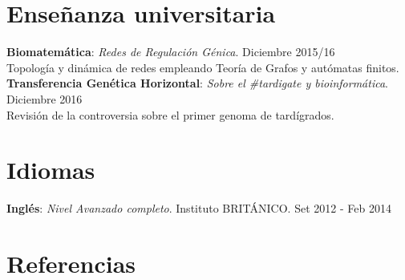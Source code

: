 \documentclass[margin,line]{res}
\begin{document}
\begin{resume}
		
		
		
		\section{\sc Enseñanza universitaria}
		{\bf Biomatemática}: {\em Redes de Regulación Génica}. \hfill {Diciembre 2015/16}\\ Topología y dinámica de redes empleando Teoría de Grafos y autómatas finitos. \\[4pt] 
		{\bf Transferencia Genética Horizontal}: {\em Sobre el \#tardigate y bioinformática}. \hfill {Diciembre 2016}\\ Revisión de la controversia sobre el primer genoma de tardígrados.\\
		
		
		\section{\sc Idiomas}
		{\bf Inglés}: {\em Nivel Avanzado completo}. Instituto BRITÁNICO. \hfill {Set 2012 - Feb 2014} \\
		
		
		\section{\sc Referencias}
		

\end{resume}
\end{document}
